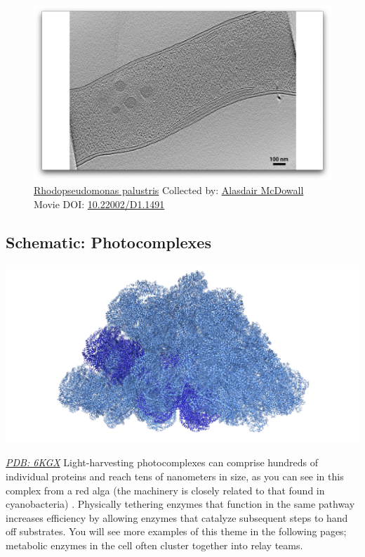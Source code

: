 \documentclass[]{tufte-book}
\begin{document}
\begin{figure}
\includegraphics{movie_stills/4_3} \caption[\protect\hyperlink{tree}{Rhodopseudomonas palustris} Collected
by: \protect\hyperlink{alasdair_mcdowall}{Alasdair McDowall} Movie DOI:
\href{https://doi.org/10.22002/D1.1491}{10.22002/D1.1491}]{\protect\hyperlink{tree}{Rhodopseudomonas palustris} Collected
by: \protect\hyperlink{alasdair_mcdowall}{Alasdair McDowall} Movie DOI:
\href{https://doi.org/10.22002/D1.1491}{10.22002/D1.1491}}\label{fig:4-3}
\end{figure}

\hypertarget{Photocomplexes}{\subsection*{Schematic:
Photocomplexes}\label{Photocomplexes}}

\includegraphics{img/schematics/4_3_1}

\href{http://rcsb.org/structure/6KGX}{\emph{PDB: 6KGX}} Light-harvesting
photocomplexes can comprise hundreds of individual proteins and reach
tens of nanometers in size, as you can see in this complex from a red
alga (the machinery is closely related to that found in cyanobacteria)
\citep{ma2020}. Physically tethering enzymes that function in the same
pathway increases efficiency by allowing enzymes that catalyze
subsequent steps to hand off substrates. You will see more examples of
this theme in the following pages; metabolic enzymes in the cell often
cluster together into relay teams.
\end{document}
